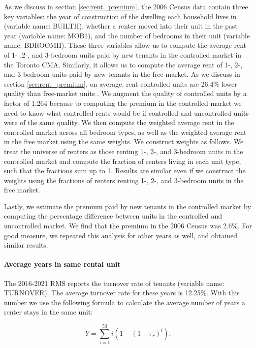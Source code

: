 \documentclass[parskip=full]{article}
\begin{document}
As we discuss in section \ref{sec:rent_premium}, the 2006 Census data contain three key variables: the year of construction of the dwelling each household lives in (variable name: BUILTH), whether a renter moved into their unit in the past year (variable name: MOB1), and the number of bedrooms in their unit (variable name: BDROOMH). These three variables allow us to compute the average rent of 1- ,2-, and 3-bedroom units paid by new tenants in the controlled market in the Toronto CMA. Similarly, it allows us to compute the average rent of 1-, 2-, and 3-bedroom units paid by new tenants in the free market. As we discuss in section \ref{sec:rent_premium}, on average, rent controlled units are 26.4\% lower quality than free-market units \citep{zhang-gou}. We augment the quality of controlled units by a factor of 1.264 because to computing the premium in the controlled market we need to know what controlled rents would be if controlled and uncontrolled units were of the same quality. We then compute the weighted average rent in the controlled market across all bedroom types, as well as the weighted average rent in the free market using the same weights. We construct weights as follows. We treat the universe of renters as those renting 1-, 2-, and 3-bedroom units in the controlled market and compute the fraction of renters living in each unit type, such that the fractions sum up to 1. Results are similar even if we construct the weights using the fractions of renters renting 1-, 2-, and 3-bedroom units in the free market.

Lastly, we estimate the premium paid by new tenants in the controlled market by computing the percentage difference between units in the controlled and uncontrolled market. We find that the premium in the 2006 Census was 2.6\%. For good measure, we repeated this analysis for other years as well, and obtained similar results.

\paragraph{Average years in same rental unit}

The 2016-2021 RMS reports the turnover rate of tenants (variable name: TURNOVER). The average turnover rate for these years is 12.25\%. With this number we use the following formula to calculate the average number of years a renter stays in the same unit:

\begin{equation}\label{eq:avg_tenure_duration}
    Y=\sum_{i=1}^{50}i(1-(1-\tau_{r})^{i}).
\end{equation}
\end{document}

